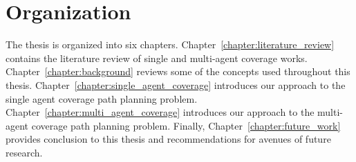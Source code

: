 \documentclass[../main.tex]{subfiles}
\begin{document}
\section{Organization}
\label{section:organization}

The thesis is organized into six chapters. Chapter~\ref{chapter:literature_review} contains the literature review of single and multi-agent coverage works. Chapter~\ref{chapter:background} reviews some of the concepts used throughout this thesis. Chapter~\ref{chapter:single_agent_coverage} introduces our approach to the single agent coverage path planning problem. Chapter~\ref{chapter:multi_agent_coverage} introduces our approach to the multi-agent coverage path planning problem. Finally, Chapter~\ref{chapter:future_work} provides conclusion to this thesis and recommendations for avenues of future research.
\end{document}
